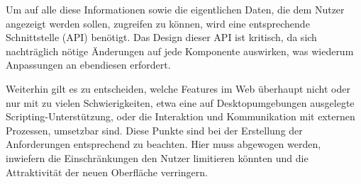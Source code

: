 Um auf alle diese Informationen sowie die eigentlichen Daten, die dem Nutzer angezeigt werden sollen, zugreifen zu können, wird eine entsprechende Schnittstelle (API) benötigt. Das Design dieser API ist kritisch, da sich nachträglich nötige Änderungen auf jede Komponente auswirken, was wiederum Anpassungen an ebendiesen erfordert.

Weiterhin gilt es zu entscheiden, welche Features im Web überhaupt nicht oder nur mit zu vielen Schwierigkeiten, etwa eine auf Desktopumgebungen ausgelegte Scripting-Unterstützung, oder die Interaktion und Kommunikation mit externen Prozessen, umsetzbar sind. Diese Punkte sind bei der Erstellung der Anforderungen entsprechend zu beachten. Hier muss abgewogen werden, inwiefern die Einschränkungen den Nutzer limitieren könnten und die Attraktivität der neuen Oberfläche verringern.
